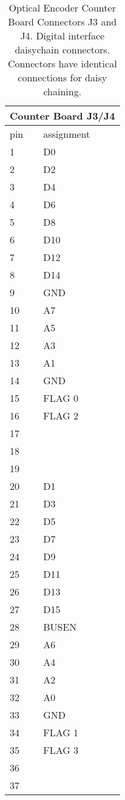   
\begin{table}[htb]
\begin{center}
\begin{tabular}{|l|l|}
\hline
\multicolumn{2}{|c|}{Counter Board J3/J4}\\
\hline
pin & assignment\\
\hline
1 & D0\\
2 & D2\\
3 & D4\\
4 & D6\\
5 & D8\\
6 & D10\\
7 & D12\\
8 & D14\\
9 & GND\\
10 & A7\\
11 & A5\\
12 & A3\\
13 & A1\\
14 & GND\\
15 & FLAG 0\\
16 & FLAG 2\\
17 & \\
18 & \\
19 & \\
20 & D1\\
21 & D3\\
22 & D5\\
23 & D7\\
24 & D9\\
25 & D11\\
26 & D13\\
27 & D15\\
28 & BUSEN\\
29 & A6\\
30 & A4\\
31 & A2\\
32 & A0\\
33 & GND\\
34 & FLAG 1\\
35 & FLAG 3\\
36 & \\
37 & \\
\hline
\end{tabular}
\caption[Optical Encoder Counter Board Connectors J3/J4]
        {Optical Encoder Counter Board Connectors J3 and J4.
         Digital interface daisychain connectors.
         Connectors have identical connections for daisy chaining.
        }
\end{center}
\end{table}

